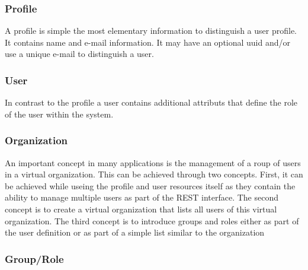 \documentclass[10pt]{article}
\begin{document}
\subsubsection{Profile}

A profile is simple the most elementary information to distinguish a
user profile. It contains name and e-mail information. It may have an
optional uuid and/or use a unique e-mail to distinguish a
user. 




\subsubsection{User}

In contrast to the profile a user contains additional attributs that
define the role of the user within the system.



\subsubsection{Organization}

An important concept in many applications is the management of a roup
of users in a virtual organization. This can be achieved through two
concepts. First, it can be achieved while useing the profile and user
resources itself as they contain the ability to manage multiple users
as part of the REST interface. The second concept is to create a
virtual organization that lists all users of this virtual
organization. The third concept is to introduce groups and roles
either as part of the user definition or as part of a simple list
similar to the organization



\subsubsection{Group/Role}
\end{document}
